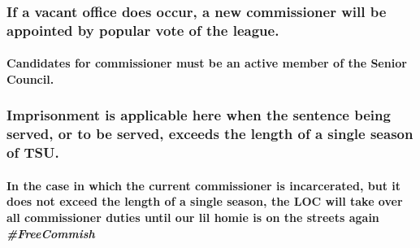 \documentclass[]{book}
\let\oldparagraph\paragraph
\renewcommand{\paragraph}[1]{\oldparagraph{#1}\mbox{}}
\begin{document}
\hypertarget{if-a-vacant-office-does-occur-a-new-commissioner-will-be-appointed-by-popular-vote-of-the-league.}{%
\subsubsection{If a vacant office does occur, a new commissioner will be appointed by popular vote of the league.}\label{if-a-vacant-office-does-occur-a-new-commissioner-will-be-appointed-by-popular-vote-of-the-league.}}

\hypertarget{candidates-for-commissioner-must-be-an-active-member-of-the-senior-council.}{%
\paragraph{Candidates for commissioner must be an active member of the Senior Council.}\label{candidates-for-commissioner-must-be-an-active-member-of-the-senior-council.}}

\hypertarget{imprisonment-is-applicable-here-when-the-sentence-being-served-or-to-be-served-exceeds-the-length-of-a-single-season-of-tsu.}{%
\subsubsection{Imprisonment is applicable here when the sentence being served, or to be served, exceeds the length of a single season of TSU.}\label{imprisonment-is-applicable-here-when-the-sentence-being-served-or-to-be-served-exceeds-the-length-of-a-single-season-of-tsu.}}

\hypertarget{in-the-case-in-which-the-current-commissioner-is-incarcerated-but-it-does-not-exceed-the-length-of-a-single-season-the-loc-will-take-over-all-commissioner-duties-until-our-lil-homie-is-on-the-streets-again-freecommish}{%
\paragraph{\texorpdfstring{In the case in which the current commissioner is incarcerated, but it does not exceed the length of a single season, the LOC will take over all commissioner duties until our lil homie is on the streets again \emph{\#FreeCommish}}{In the case in which the current commissioner is incarcerated, but it does not exceed the length of a single season, the LOC will take over all commissioner duties until our lil homie is on the streets again \#FreeCommish}}\label{in-the-case-in-which-the-current-commissioner-is-incarcerated-but-it-does-not-exceed-the-length-of-a-single-season-the-loc-will-take-over-all-commissioner-duties-until-our-lil-homie-is-on-the-streets-again-freecommish}}
\end{document}
